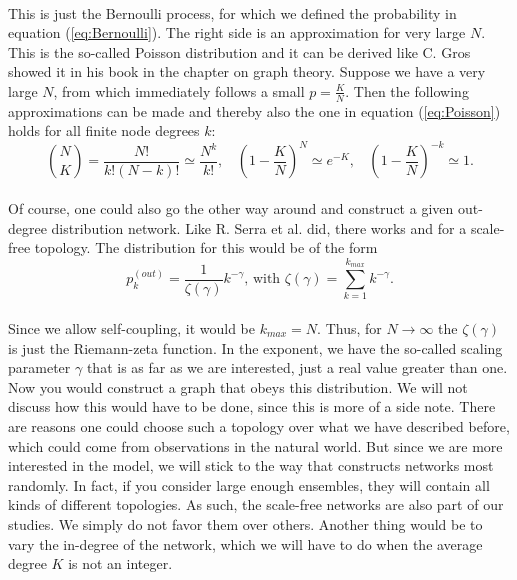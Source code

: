 \paragraph*{}
This is just the Bernoulli process, for which we defined the probability in equation (\ref{eq:Bernoulli}). The right side is an approximation for very large $ N $. This is the so-called Poisson distribution and it can be derived like C. Gros \cite{gros2010complex} showed it in his book in the chapter on graph theory. Suppose we have a very large $ N $, from which immediately follows a small $p=\tfrac{K}{N}$. Then the following approximations can be made and thereby also the one in equation (\ref{eq:Poisson}) holds for all finite node degrees $ k $:
\begin{equation}
{N\choose K} = \frac{N!}{k!(N-k)!} \simeq \frac{N^k}{k!},\ \ \ \ \left(1-\frac{K}{N} \right)^N \simeq e^{-K},\ \ \ \ \left(1-\frac{K}{N} \right)^{-k} \simeq 1.
\end{equation}

\paragraph*{}
Of course, one could also go the other way around and construct a given out-degree distribution network. Like R. Serra et al. did, there works \cite{serra2004dynamics} and \cite{serra2008simulation} for a scale-free topology. The distribution for this would be of the form
\begin{equation}\label{eq:scale_free_degree_distribution}
p_k^{(out)} = \frac{1}{\zeta(\gamma)}k^{-\gamma}\text{, with } \zeta(\gamma)= \sum\limits_{k=1}^{k_{max}}k^{-\gamma}.
\end{equation}

\paragraph*{}
Since we allow self-coupling, it would be $k_{max}=N$. Thus, for $N\longrightarrow \infty$ the $\zeta(\gamma)$ is just the Riemann-zeta function. In the exponent, we have the so-called scaling parameter $\gamma$ that is as far as we are interested, just a real value greater than one. Now you would construct a graph that obeys this distribution. We will not discuss how this would have to be done, since this is more of a side note. There are reasons one could choose such a topology over what we have described before, which could come from observations in the natural world. But since we are more interested in the model, we will stick to the way that constructs networks most randomly. In fact, if you consider large enough ensembles, they will contain all kinds of different topologies. As such, the scale-free networks are also part of our studies. We simply do not favor them over others. Another thing would be to vary the in-degree of the network, which we will have to do when the average degree $K$ is not an integer.

